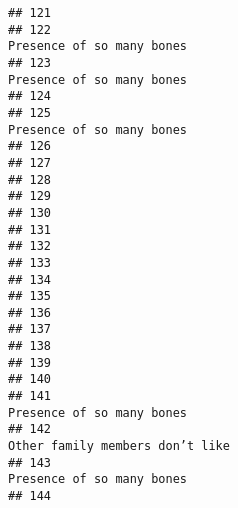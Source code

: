 \documentclass[
]{article}
\begin{document}
\begin{verbatim}
## 121                                                                                                        
## 122                                                                               Presence of so many bones
## 123                                                                               Presence of so many bones
## 124                                                                                                        
## 125                                                                               Presence of so many bones
## 126                                                                                                        
## 127                                                                                                        
## 128                                                                                                        
## 129                                                                                                        
## 130                                                                                                        
## 131                                                                                                        
## 132                                                                                                        
## 133                                                                                                        
## 134                                                                                                        
## 135                                                                                                        
## 136                                                                                                        
## 137                                                                                                        
## 138                                                                                                        
## 139                                                                                                        
## 140                                                                                                        
## 141                                                                               Presence of so many bones
## 142                                                                         Other family members don’t like
## 143                                                                               Presence of so many bones
## 144                                                                                                        

\end{verbatim}
\end{document}

